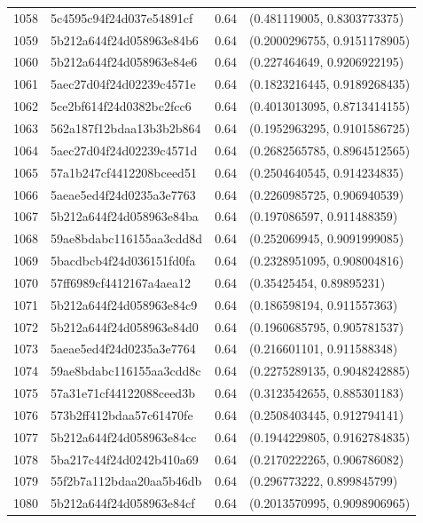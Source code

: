 \begin{table}[ht]
\begin{tabular}{rlrl}
  1058 & 5c4595c94f24d037e54891cf & 0.64 & (0.481119005, 0.8303773375) \\ 
  1059 & 5b212a644f24d058963e84b6 & 0.64 & (0.2000296755, 0.9151178905) \\ 
  1060 & 5b212a644f24d058963e84e6 & 0.64 & (0.227464649, 0.9206922195) \\ 
  1061 & 5aec27d04f24d02239c4571e & 0.64 & (0.1823216445, 0.9189268435) \\ 
  1062 & 5ce2bf614f24d0382bc2fcc6 & 0.64 & (0.4013013095, 0.8713414155) \\ 
  1063 & 562a187f12bdaa13b3b2b864 & 0.64 & (0.1952963295, 0.9101586725) \\ 
  1064 & 5aec27d04f24d02239c4571d & 0.64 & (0.2682565785, 0.8964512565) \\ 
  1065 & 57a1b247cf4412208bceed51 & 0.64 & (0.2504640545, 0.914234835) \\ 
  1066 & 5aeae5ed4f24d0235a3e7763 & 0.64 & (0.2260985725, 0.906940539) \\ 
  1067 & 5b212a644f24d058963e84ba & 0.64 & (0.197086597, 0.911488359) \\ 
  1068 & 59ae8bdabc116155aa3cdd8d & 0.64 & (0.252069945, 0.9091999085) \\ 
  1069 & 5bacdbcb4f24d036151fd0fa & 0.64 & (0.2328951095, 0.908004816) \\ 
  1070 & 57ff6989cf4412167a4aea12 & 0.64 & (0.35425454, 0.89895231) \\ 
  1071 & 5b212a644f24d058963e84c9 & 0.64 & (0.186598194, 0.911557363) \\ 
  1072 & 5b212a644f24d058963e84d0 & 0.64 & (0.1960685795, 0.905781537) \\ 
  1073 & 5aeae5ed4f24d0235a3e7764 & 0.64 & (0.216601101, 0.911588348) \\ 
  1074 & 59ae8bdabc116155aa3cdd8c & 0.64 & (0.2275289135, 0.9048242885) \\ 
  1075 & 57a31e71cf44122088ceed3b & 0.64 & (0.3123542655, 0.885301183) \\ 
  1076 & 573b2ff412bdaa57c61470fe & 0.64 & (0.2508403445, 0.912794141) \\ 
  1077 & 5b212a644f24d058963e84cc & 0.64 & (0.1944229805, 0.9162784835) \\ 
  1078 & 5ba217c44f24d0242b410a69 & 0.64 & (0.2170222265, 0.906786082) \\ 
  1079 & 55f2b7a112bdaa20aa5b46db & 0.64 & (0.296773222, 0.899845799) \\ 
  1080 & 5b212a644f24d058963e84cf & 0.64 & (0.2013570995, 0.9098906965) \\ 

\end{tabular}
\end{table}
